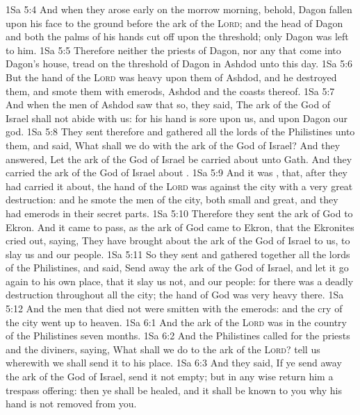 \vs 1Sa 5:4 And when they arose early on the morrow morning, behold, Dagon  fallen upon his face to the ground before the ark of the \textsc{Lord}; and the head of Dagon and both the palms of his hands  cut off upon the threshold; only  Dagon was left to him.
\vs 1Sa 5:5 Therefore neither the priests of Dagon, nor any that come into Dagon's house, tread on the threshold of Dagon in Ashdod unto this day.
\vs 1Sa 5:6 But the hand of the \textsc{Lord} was heavy upon them of Ashdod, and he destroyed them, and smote them with emerods,  Ashdod and the coasts thereof.
\vs 1Sa 5:7 And when the men of Ashdod saw that  so, they said, The ark of the God of Israel shall not abide with us: for his hand is sore upon us, and upon Dagon our god.
\vs 1Sa 5:8 They sent therefore and gathered all the lords of the Philistines unto them, and said, What shall we do with the ark of the God of Israel? And they answered, Let the ark of the God of Israel be carried about unto Gath. And they carried the ark of the God of Israel about .
\vs 1Sa 5:9 And it was , that, after they had carried it about, the hand of the \textsc{Lord} was against the city with a very great destruction: and he smote the men of the city, both small and great, and they had emerods in their secret parts.
\vs 1Sa 5:10 Therefore they sent the ark of God to Ekron. And it came to pass, as the ark of God came to Ekron, that the Ekronites cried out, saying, They have brought about the ark of the God of Israel to us, to slay us and our people.
\vs 1Sa 5:11 So they sent and gathered together all the lords of the Philistines, and said, Send away the ark of the God of Israel, and let it go again to his own place, that it slay us not, and our people: for there was a deadly destruction throughout all the city; the hand of God was very heavy there.
\vs 1Sa 5:12 And the men that died not were smitten with the emerods: and the cry of the city went up to heaven.
\vs 1Sa 6:1 And the ark of the \textsc{Lord} was in the country of the Philistines seven months.
\vs 1Sa 6:2 And the Philistines called for the priests and the diviners, saying, What shall we do to the ark of the \textsc{Lord}? tell us wherewith we shall send it to his place.
\vs 1Sa 6:3 And they said, If ye send away the ark of the God of Israel, send it not empty; but in any wise return him a trespass offering: then ye shall be healed, and it shall be known to you why his hand is not removed from you.
